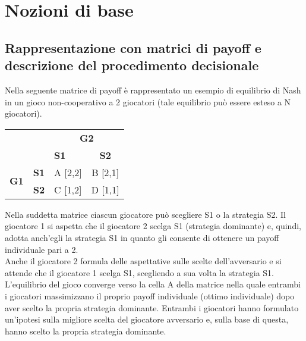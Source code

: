 \section{Nozioni di base}

\subsection{Rappresentazione con matrici di payoff e descrizione del procedimento decisionale}
\justify
Nella seguente matrice di payoff è rappresentato un esempio di equilibrio di Nash in un gioco non-cooperativo a 2 giocatori (tale equilibrio può essere esteso a N giocatori).

\vspace{0.5cm}
\begin{center}
\scalebox{1} {
  \begin{tabular}{cc|m{2cm}|c|}
	\cline{3-4} 
 	& & \multicolumn{2}{c|}{\textbf{G2}} \\ \cline{3-4} 
 	& & \textbf{S1} & \textbf{S2} \\ \hline
	\multicolumn{1}{|c|}{\multirow{2}{*}{\textbf{G1}}} & \textbf{S1} & A [2,2] & B [2,1] \\ \cline{2-4} 
	\multicolumn{1}{|c|}{} & \textbf{S2} & C [1,2] & D [1,1] \\ \hline
\end{tabular}
}
\end{center}
\vspace{0.5cm}

Nella suddetta matrice ciascun giocatore può scegliere S1 o la strategia S2. Il giocatore 1 si aspetta che il giocatore 2 scelga S1 (strategia dominante) e, quindi, adotta anch'egli la strategia S1 in quanto gli consente di ottenere un payoff individuale pari a 2.\\
Anche il giocatore 2 formula delle aspettative sulle scelte dell'avversario e si attende che il giocatore 1 scelga S1, scegliendo a sua volta la strategia S1.\\
L'equilibrio del gioco converge verso la cella A della matrice nella quale entrambi i giocatori massimizzano il proprio payoff individuale (ottimo individuale) dopo aver scelto la propria strategia dominante. Entrambi i giocatori hanno formulato un'ipotesi sulla migliore scelta del giocatore avversario e, sulla base di questa, hanno scelto la propria strategia dominante.\newline

